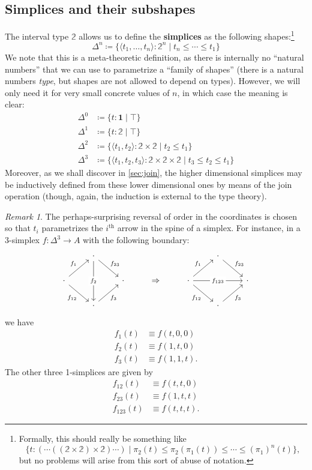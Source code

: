 \documentclass[12pt]{amsart}
\theoremstyle{plain}
\theoremstyle{definition}
\theoremstyle{remark}
\newtheorem{rmk}[thm]{Remark}
\numberwithin{equation}{section}
\newcommand{\jdeq}{\equiv}
\newcommand{\defeq}{\coloneqq}
\newcommand{\unittype}{\ensuremath{\mathbf{1}}}
\newcommand{\sh}[2]{\{#1\mid #2\}}
\newcommand{\pair}[1]{\langle #1\rangle}
\newcommand{\two}{\mathbb{2}}
\begin{document}
\subsection{Simplices and their subshapes}
\label{sec:sub-simplices}

The interval type $\two$ allows us to define the \textbf{simplices} as the following shapes:\footnote{Formally, this should really be something like \[\sh{t:(\cdots((\two\times \two)\times \two)\cdots)}{\pi_2(t) \le \pi_2(\pi_1(t)) \le \cdots \le (\pi_1)^n(t)},\] but no problems will arise from this sort of abuse of notation.}
\[ \Delta^n \defeq \sh{\pair{t_1,\dots,t_n}:\two^n}{t_n\le\cdots\le t_1} \]
We note that this is a meta-theoretic definition, as there is internally no ``natural numbers'' that we can use to parametrize a ``family of shapes'' (there is a natural numbers \emph{type}, but shapes are not allowed to depend on types).
However, we will only need it for very small concrete values of $n$, in which case the meaning is clear:
\begin{align*}
  \Delta^0 &\defeq \sh{t:\unittype}{\top}\\
  \Delta^1 &\defeq \sh{t:\two}{\top}\\
  \Delta^2 &\defeq \sh{\pair{t_1,t_2}:\two\times\two}{t_2\le t_1}\\
  \Delta^3 &\defeq \sh{\pair{t_1,t_2,t_3}:\two\times\two\times\two}{t_3\le t_2 \le t_1}
\end{align*}
Moreover, as we shall discover in \cref{sec:join}, the higher dimensional simplices may be inductively defined from these lower dimensional ones by means of the join operation (though, again, the induction is external to the type theory).

\begin{rmk}
  The perhaps-surprising reversal of order in the coordinates is chosen so that $t_i$ parametrizes the $i^{\mathrm{th}}$ arrow in the spine of a simplex.
  For instance, in a 3-simplex $f:\Delta^3 \to A$ with the following boundary:
  \[
  \begin{tikzcd}
    & \cdot\ar[dr,"f_{23}"] \ar[dd,"f_2" description] &&&& \cdot \ar[dr,"f_{23}"]\\
    \cdot\ar[ur,"f_{1}"] \ar[dr,"f_{12}"'] && \cdot & \Rightarrow & \cdot\ar[ur,"f_{1}"] \ar[dr,"f_{12}"'] \ar[rr,"f_{123}" description] && \cdot\\
    & \cdot\ar[ur,"f_3"'] &&&& \cdot\ar[ur,"f_3"']
  \end{tikzcd}
  \]
  we have
  \begin{align*}
    f_1(t) &\jdeq f(t,0,0)\\
    f_2(t) &\jdeq f(1,t,0)\\
    f_3(t) &\jdeq f(1,1,t).
  \end{align*}
  The other three 1-simplices are given by
  \begin{align*}
    f_{12}(t) &\jdeq f(t,t,0)\\
    f_{23}(t) &\jdeq f(1,t,t)\\
    f_{123}(t) &\jdeq f(t,t,t).
  \end{align*}
\end{rmk}
\end{document}
